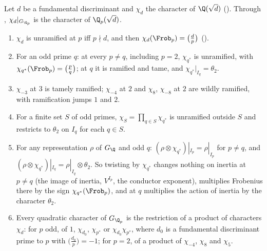 \begin{proposition}\label{prop:local:global-quadratic-local}
Let $d$ be a fundamental discriminant and $\chi_d$ the character of $\Q(\sqrt d)$ (). Through , $\chi_d|_{G_{\Q_p}}$ is the
character of $\Q_p(\sqrt d)$.
\begin{enumerate}[label=(\roman*)]
\item $\chi_d$ is unramified at $p$ iff $p\nmid d$, and then $\chi_d(\Frob_p)=\bigl(\frac dp\bigr)$ ().
\item For an odd prime $q$: at every $p\ne q$, including $p=2$, $\chi_{q^*}$ is unramified, with $\chi_{q^*}(\Frob_p)=\bigl(\frac pq\bigr)$; at $q$ it is ramified and tame, and
$\chi_{q^*}|_{I_q}=\theta_2$.
\item $\chi_{-3}$ at $3$ is tamely ramified; $\chi_{-4}$ at $2$ and $\chi_{8}$, $\chi_{-8}$ at $2$ are wildly ramified, with ramification jumps $1$ and $2$.
\item For a finite set $S$ of odd primes, $\chi_S=\prod_{q\in S}\chi_{q^*}$ is unramified outside $S$ and restricts to $\theta_2$ on $I_q$ for each $q\in S$.
\item For any representation $\rho$ of $G_\Q$ and odd $q$: $(\rho\otimes\chi_{q^*})|_{I_p}=\rho|_{I_p}$ for $p\ne q$, and $(\rho\otimes\chi_{q^*})|_{I_q}=\rho|_{I_q}\otimes\theta_2$. So
twisting by $\chi_{q^*}$ changes nothing on inertia at $p\ne q$ (the image of inertia, $V^{I_p}$, the conductor exponent), multiplies Frobenius
there by the sign $\chi_{q^*}(\Frob_p)$, and at $q$ multiplies the action of inertia by the character $\theta_2$.
\item Every quadratic character of $G_{\Q_p}$ is the restriction of a product of characters $\chi_d$: for $p$ odd, of $1$, $\chi_{d_0}$, $\chi_{p^*}$ or
$\chi_{d_0}\chi_{p^*}$, where $d_0$ is a fundamental discriminant prime to $p$ with $\bigl(\frac{d_0}p\bigr)=-1$; for $p=2$, of a product of $\chi_{-4}$, $\chi_8$ and
$\chi_5$.
\end{enumerate}
\end{proposition}

